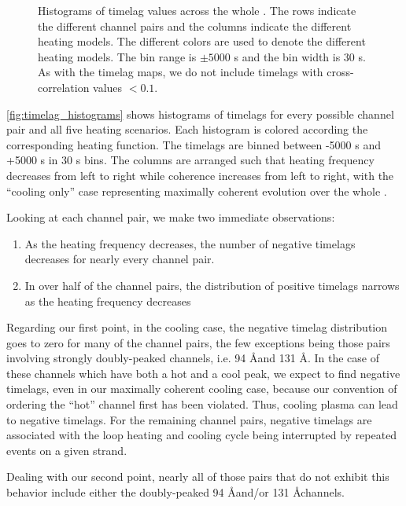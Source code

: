 \begin{figure*}
    \caption{Histograms of timelag values across the whole \AR. The rows indicate the different channel pairs and the columns indicate the different heating models. The different colors are used to denote the different heating models. The bin range is $\pm5000$ s and the bin width is 30 s. As with the timelag maps, we do not include timelags with cross-correlation values $<0.1$.}
    \label{fig:timelag_histograms}
\end{figure*}

\autoref{fig:timelag_histograms} shows histograms of timelags for every possible channel pair and all five heating scenarios. Each histogram is colored according the corresponding heating function. The timelags are binned between -5000 s and +5000 s in 30 s bins. The columns are arranged such that heating frequency decreases from left to right while coherence increases from left to right, with the ``cooling only'' case representing maximally coherent evolution over the whole \AR.

Looking at each channel pair, we make two immediate observations: 
\begin{enumerate}
\item As the heating frequency decreases, the number of negative timelags decreases for nearly every channel pair.
\item In over half of the channel pairs, the distribution of positive timelags narrows as the heating frequency decreases
\end{enumerate}

Regarding our first point, in the cooling case, the negative timelag distribution goes to zero for many of the channel pairs, the few exceptions being those pairs involving strongly doubly-peaked channels, i.e. 94 \AA and 131 \AA. In the case of these channels which have both a hot and a cool peak, we expect to find negative timelags, even in our maximally coherent cooling case, because our convention of ordering the ``hot'' channel first has been violated. Thus, cooling plasma can lead to negative timelags. For the remaining channel pairs, negative timelags are associated with the loop heating and cooling cycle being interrupted by repeated events on a given strand. 

Dealing with our second point, nearly all of those pairs that do not exhibit this behavior include either the doubly-peaked 94 \AA and/or 131 \AA channels. 

